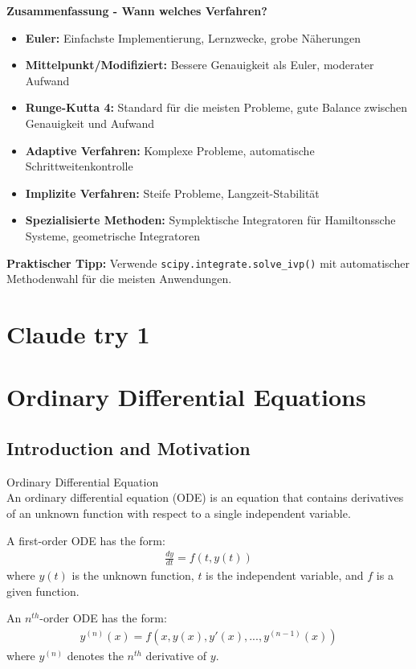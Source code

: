 \begin{remark}
\textbf{Zusammenfassung - Wann welches Verfahren?}
\begin{itemize}
    \item \textbf{Euler:} Einfachste Implementierung, Lernzwecke, grobe Näherungen
    \item \textbf{Mittelpunkt/Modifiziert:} Bessere Genauigkeit als Euler, moderater Aufwand
    \item \textbf{Runge-Kutta 4:} Standard für die meisten Probleme, gute Balance zwischen Genauigkeit und Aufwand
    \item \textbf{Adaptive Verfahren:} Komplexe Probleme, automatische Schrittweitenkontrolle
    \item \textbf{Implizite Verfahren:} Steife Probleme, Langzeit-Stabilität
    \item \textbf{Spezialisierte Methoden:} Symplektische Integratoren für Hamiltonssche Systeme, geometrische Integratoren
\end{itemize}

\textbf{Praktischer Tipp:} Verwende \texttt{scipy.integrate.solve\_ivp()} mit automatischer Methodenwahl für die meisten Anwendungen.
\end{remark}

\section{Claude try 1}

\section{Ordinary Differential Equations}

\subsection{Introduction and Motivation}

\begin{definition}{Ordinary Differential Equation}\\
An ordinary differential equation (ODE) is an equation that contains derivatives of an unknown function with respect to a single independent variable. 

A first-order ODE has the form:
\begin{align*}
\frac{dy}{dt} = f(t, y(t))
\end{align*}
where $y(t)$ is the unknown function, $t$ is the independent variable, and $f$ is a given function.

An $n^{th}$-order ODE has the form:
\begin{align*}
y^{(n)}(x) = f(x, y(x), y'(x), ..., y^{(n-1)}(x))
\end{align*}
where $y^{(n)}$ denotes the $n^{th}$ derivative of $y$.
\end{definition}

